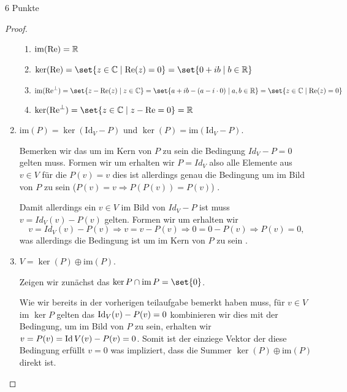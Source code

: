 \documentclass{problemset}
\begin{document}
\begin{problem}[Projektionen]{6 Punkte}
\begin{proof}
\begin{enumerate}
              \begin{enumerate}
                  \item $\operatorname{im}(\operatorname{Re}) = \mathbb{R}$ \checkmark
                  \item $\ker(\operatorname{Re}) = \set{z \in \field{C} \mid \operatorname{Re}(z) = 0} = \set{0 + ib \mid b \in \reals}$ \checkmark
                  \item $\operatorname{im}(\operatorname{Re}^\perp) = \set{ z - \operatorname{Re}(z) \mid z \in \field{C}} = \set { a + ib - (a - i \cdot 0) \mid a,b \in \reals} = \set{ z \in \field{C} \mid \operatorname{Re}(z) = 0}$ \checkmark
                  \item $\operatorname{ker}(\operatorname{Re}^\perp) = \set{ z \in \field{C} \mid z - \operatorname{Re} = 0} = \reals $ \checkmark

              \end{enumerate}

        \item $\text{im}(P) = \ker(\text{Id}_V - P)$ und $\ker(P) = \text{im}(\text{Id}_V - P)$.

              Bemerken wir das um im Kern von $P$ zu sein die Bedingung $Id_V -
              P = 0$ gelten muss. Formen wir um erhalten wir $P = Id_V$ also
              alle Elemente aus $v \in V$ für die $P(v) = v$ dies ist
              allerdings genau die Bedingung um im Bild von $P$ zu sein ($P(v)
              = v \Rightarrow P(P(v)) = P(v)$) \checkmark.

              Damit allerdings ein $v \in V$ im Bild von $Id_V - P$ ist muss $v
              = Id_V(v) - P(v)$ gelten. Formen wir um erhalten wir \[
                  v = Id_V(v) - P(v) \Rightarrow v = v - P(v) \Rightarrow 0 = 0 - P(v) \Rightarrow P(v) = 0,
              \] was allerdings die Bedingung ist um im Kern von $P$ zu sein
                 \checkmark.

        \item $V = \ker(P) \oplus \text{im}(P)$.

              Zeigen wir zunächst das $\ker{P} \cap \im{P} = \set{0}$.

              Wie wir bereits in der vorherigen teilaufgabe bemerkt haben muss,
              für $v \in V$ im $\ker P$ gelten das $\operatorname{Id}_V(v) - P(v) = 0$
              kombinieren wir dies mit der Bedingung, um im Bild von $P$ zu
              sein, erhalten wir $v = P(v) = \operatorname{Id}{V}(v) - P(v) = 0$. Somit ist
              der einziege Vektor der diese Bedingung erfüllt $v = 0$ was
              impliziert, dass die Summer $\ker(P) \oplus \text{im}(P)$ direkt
              ist.


\end{enumerate}
\end{proof}
\end{problem}
\end{document}
